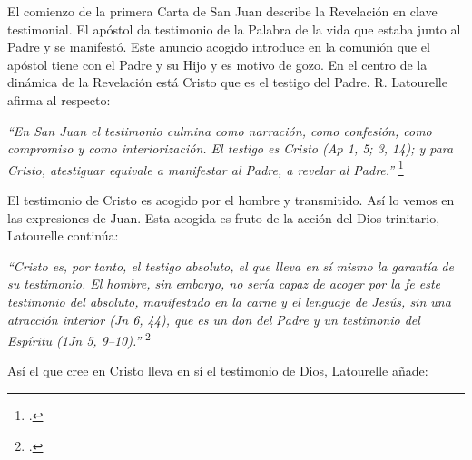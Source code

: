 \documentclass[11pt]{article}
\begin{document}
El comienzo de la primera Carta de San Juan describe la Revelación en clave testimonial. El apóstol da testimonio de la Palabra de la vida que estaba junto al Padre y se manifestó. Este anuncio acogido introduce en la comunión que el apóstol tiene con el Padre y su Hijo y es motivo de gozo. En el centro de la dinámica de la Revelación está Cristo que es el testigo del Padre. R. Latourelle afirma al respecto:

\emph{
``En San Juan el testimonio culmina como narración, como confesión, como compromiso y como interiorización. El testigo es Cristo (Ap 1, 5; 3, 14); y para Cristo, atestiguar equivale a manifestar al Padre, a revelar al Padre.''
}\footcite[1529]{dicctf}

El testimonio de Cristo es acogido por el hombre y transmitido. Así lo vemos en las expresiones de Juan. Esta acogida es fruto de la acción del Dios trinitario, Latourelle continúa:

\emph{
``Cristo es, por tanto, el testigo absoluto, el que lleva en sí mismo la garantía de su testimonio. El hombre, sin embargo, no sería capaz de acoger por la fe este testimonio del absoluto, manifestado en la carne y el lenguaje de Jesús, sin una atracción interior (Jn 6, 44), que es un don del Padre y un testimonio del Espíritu (1Jn 5, 9--10).''
}\footcite[1530]{dicctf}

Así el que cree en Cristo lleva en sí el testimonio de Dios, Latourelle añade:
\end{document}
